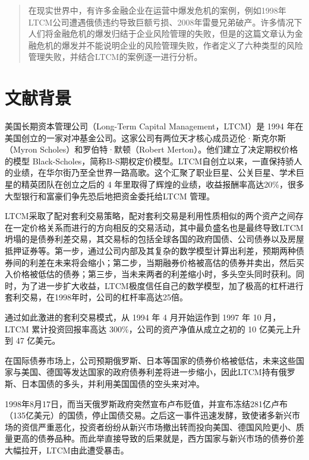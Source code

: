 \begin{abstract}
    在现实世界中，有许多金融企业在运营中爆发危机的案例，例如1998年LTCM公司遭遇俄债违约导致巨额亏损、2008年雷曼兄弟破产。许多情况下人们将金融危机的爆发归结于企业风险管理的失败，但是\citeauthor{stulz2008risk}的这篇文章认为金融危机的爆发并不能说明企业的风险管理失败，作者定义了六种类型的风险管理失败，并结合LTCM的案例逐一进行分析。
\end{abstract}
\section{文献背景}
美国长期资本管理公司（Long-Term Capital Management，LTCM）是 1994 年在美国创立的一家对冲基金公司。这家公司有两位天才核心成员迈伦·斯克尔斯（Myron Scholes）和罗伯特·默顿（Robert Merton）。他们建立了决定期权价格的模型 Black-Scholes，简称B-S期权定价模型。LTCM自创立以来，一直保持骄人的业绩，在华尔街乃至全世界一路高歌。这个汇聚了职业巨星、公关巨星、学术巨星的精英团队在创立之后的 4 年里取得了辉煌的业绩，收益报酬率高达20\%，很多大型银行和富豪们争先恐后地把资金委托给LTCM 管理。

LTCM采取了配对套利交易策略，配对套利交易是利用性质相似的两个资产之间存在一定价格关系而进行的方向相反的交易活动，其中最负盛名也是最终导致LTCM坍塌的是债券利差交易，其交易标的包括全球各国的政府国债、公司债券以及房屋抵押证券等。第一步，通过公司内部及其复杂的数学模型计算出利差，预期两种债券间的利差在未来将会缩小；第二步，当期融券价格被高估的债券并卖出，然后买入价格被低估的债券；第三步，当未来两者的利差缩小时，多头空头同时获利。同时，为了进一步扩大收益，LTCM极度信任自己的数学模型，加了极高的杠杆进行套利交易，在1998年时，公司的杠杆率高达25倍。

通过如此激进的套利交易模式，从 1994 年 4 月开始运作到 1997 年 10 月，LTCM 累计投资回报率高达 300\%，公司的资产净值从成立之初的 10 亿美元上升到 47 亿美元。

在国际债券市场上，公司预期俄罗斯、日本等国家的债券价格被低估，未来这些国家与美国、德国等发达国家的政府债券利差将进一步缩小，因此LTCM持有俄罗斯、日本国债的多头，并利用美国国债的空头来对冲。

1998年8月17日，而当天俄罗斯政府突然宣布卢布贬值，并宣布冻结281亿卢布（135亿美元）的国债，停止国债交易。之后这一事件迅速发酵，致使诸多新兴市场的资信严重恶化，投资者纷纷从新兴市场撤出转而投向美国、德国风险更小、质量更高的债券品种。而此举直接导致的后果就是，西方国家与新兴市场的债券价差大幅拉开，LTCM由此遭受暴击。

